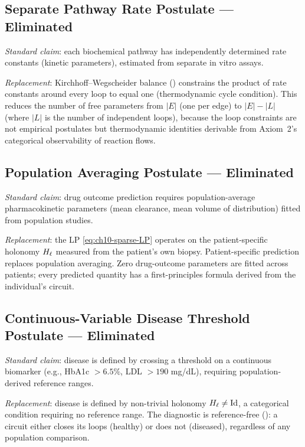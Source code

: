 \subsection{Separate Pathway Rate Postulate — Eliminated}

\emph{Standard claim}: each biochemical pathway has independently determined
rate constants (kinetic parameters), estimated from separate in vitro assays.

\emph{Replacement}: Kirchhoff--Wegscheider balance ()
constrains the product of rate constants around every loop to equal one
(thermodynamic cycle condition).  This reduces the number of free parameters
from $|E|$ (one per edge) to $|E| - |L|$ (where $|L|$ is the number of
independent loops), because the loop constraints are not empirical postulates
but thermodynamic identities derivable from Axiom~2's categorical observability
of reaction flows.

\subsection{Population Averaging Postulate — Eliminated}

\emph{Standard claim}: drug outcome prediction requires population-average
pharmacokinetic parameters (mean clearance, mean volume of distribution)
fitted from population studies.

\emph{Replacement}: the LP \eqref{eq:ch10-sparse-LP} operates on the
patient-specific holonomy $H_\ell$ measured from the patient's own biopsy.
Patient-specific prediction replaces population averaging.  Zero drug-outcome
parameters are fitted across patients; every predicted quantity has a first-principles
formula derived from the individual's circuit.

\subsection{Continuous-Variable Disease Threshold Postulate — Eliminated}

\emph{Standard claim}: disease is defined by crossing a threshold on a
continuous biomarker (e.g., HbA1c $> 6.5\%$, LDL $> 190$ mg/dL), requiring
population-derived reference ranges.

\emph{Replacement}: disease is defined by non-trivial holonomy $H_\ell \neq
\mathrm{Id}$, a categorical condition requiring no reference range.  The
diagnostic is reference-free (): a circuit either
closes its loops (healthy) or does not (diseased), regardless of any
population comparison.

